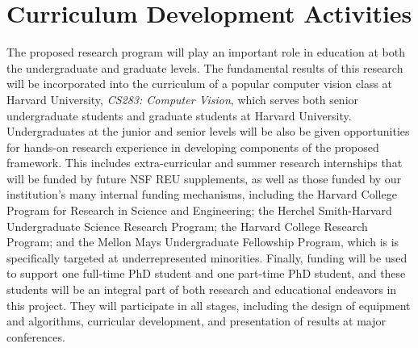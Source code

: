 \vspace{-8pt}
\section{Curriculum Development Activities}
\label{sec:curriculum}
\vspace{-8pt}
The proposed research program will play an important role in education at both the undergraduate and graduate levels. The fundamental results of this research will be incorporated into the curriculum of a popular computer vision class at Harvard University, \emph{CS283: Computer Vision}, which serves both senior undergraduate students and graduate students at Harvard University. Undergraduates at the junior and senior levels will be also be given opportunities for hands-on research experience in developing components of the proposed framework. This includes extra-curricular and summer research internships that will be funded by future NSF REU supplements, as well as those funded by our institution's many internal funding mechanisms, including the Harvard College Program for Research in Science and Engineering; the Herchel Smith-Harvard Undergraduate Science Research Program; the Harvard College Research Program; and the Mellon Mays Undergraduate Fellowship Program, which is is specifically targeted at underrepresented minorities. Finally, funding will be used to support one full-time PhD student and one part-time PhD student, and these students will be an integral part of both research and educational endeavors in this project. They will participate in all stages, including the design of equipment and algorithms, curricular development, and presentation of results at major conferences.


